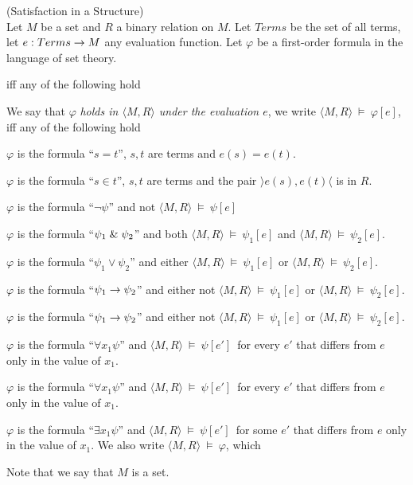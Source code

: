 \begin{definition}{(Satisfaction in a Structure)}\label{def:satisfaction}\\
Let $M$ be a set and $R$ a binary relation on $M$. Let $Terms$ be the set of all terms, let $e: Terms \rightarrow M$ any evaluation function. Let $\varphi$  be a first-order formula in the language of set theory.

 iff any of the following hold 

We say that $\varphi$ \emph{holds in $\langle M, R \rangle$ under the evaluation $e$}, we write $\langle M, R \rangle~\models~\varphi[e]$, iff any of the following hold
\bce[(i)]
\item $\varphi$ is the formula ``$s = t$'', $s, t$ are terms and $e(s) = e(t)$.
\item $\varphi$ is the formula ``$s \in t$'', $s, t$ are terms and the pair $\rangle e(s), e(t) \langle$ is in $R$.
\item $\varphi$ is the formula ``$\neg\psi$'' and not $\langle M, R \rangle~\models~\psi[e]$
\item $\varphi$ is the formula ``$\psi_1 \mathrel{\&} \psi_2$'' and both $\langle M, R \rangle~\models~\psi_1[e]$ and $\langle M, R \rangle~\models~\psi_2[e]$.
\item $\varphi$ is the formula ``$\psi_1 \lor \psi_2$'' and either $\langle M, R \rangle~\models~\psi_1[e]$ or $\langle M, R \rangle~\models~\psi_2[e]$.
\item $\varphi$ is the formula ``$\psi_1 \rightarrow \psi_2$'' and either not $\langle M, R \rangle~\models~\psi_1[e]$ or $\langle M, R \rangle~\models~\psi_2[e]$.
\item $\varphi$ is the formula ``$\psi_1 \rightarrow \psi_2$'' and either not $\langle M, R \rangle~\models~\psi_1[e]$ or $\langle M, R \rangle~\models~\psi_2[e]$.
\item $\varphi$ is the formula ``$\forall x_1 \psi$'' and $\langle M, R \rangle~\models~\psi[e']$ for every $e'$ that differs from $e$ only in the value of $x_1$.
\item $\varphi$ is the formula ``$\forall x_1 \psi$'' and $\langle M, R \rangle~\models~\psi[e']$ for every $e'$ that differs from $e$ only in the value of $x_1$.
\item $\varphi$ is the formula ``$\exists x_1 \psi$'' and $\langle M, R \rangle~\models~\psi[e']$ for some $e'$ that differs from $e$ only in the value of $x_1$.
\ece
We also write $\langle M, R \rangle~\models~\varphi$, which 
\end{definition}
Note that we say that $M$ is a set. 

